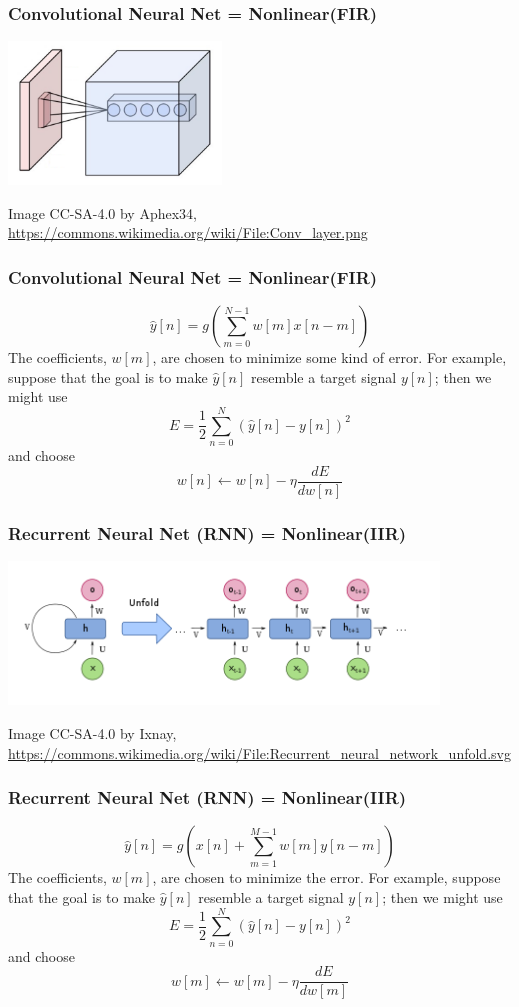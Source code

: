 \documentclass{beamer}
\begin{document}
\begin{frame}
  \frametitle{Convolutional Neural Net = Nonlinear(FIR)}
  \centerline{\includegraphics[height=1.5in]{Conv_layer.png}}
  \begin{tiny}Image CC-SA-4.0  by Aphex34, \url{https://commons.wikimedia.org/wiki/File:Conv_layer.png}\end{tiny}
\end{frame}

\begin{frame}
  \frametitle{Convolutional Neural Net = Nonlinear(FIR)}
  \[
  \hat{y}[n] = g\left(\sum_{m=0}^{N-1}w[m]x[n-m]\right)
  \]
  The coefficients, $w[m]$, are chosen to minimize some kind of error.
  For example, suppose that the goal is to make $\hat{y}[n]$ resemble a
  target signal $y[n]$; then we might use 
  \[
  E = \frac{1}{2}\sum_{n=0}^N\left(\hat{y}[n]-y[n]\right)^2
  \]
  and choose
  \[
  w[n] \leftarrow w[n]-\eta\frac{dE}{dw[n]}
  \]
\end{frame}

\begin{frame}
  \frametitle{Recurrent Neural Net (RNN) = Nonlinear(IIR)}
  \centerline{\includegraphics[width=4.5in]{Recurrent.png}}
  \begin{tiny}Image CC-SA-4.0  by Ixnay, \url{https://commons.wikimedia.org/wiki/File:Recurrent_neural_network_unfold.svg}\end{tiny}
\end{frame}

\begin{frame}
  \frametitle{Recurrent Neural Net (RNN) = Nonlinear(IIR)}
  \[
  \hat{y}[n] = g\left(x[n] + \sum_{m=1}^{M-1}w[m] y[n-m]\right)
  \]
  The coefficients, $w[m]$, are chosen to minimize the error.
  For example, suppose that the goal is to make $\hat{y}[n]$ resemble a
  target signal $y[n]$; then we might use 
  \[
  E = \frac{1}{2}\sum_{n=0}^N\left(\hat{y}[n]-y[n]\right)^2
  \]
  and choose
  \[
  w[m] \leftarrow w[m]-\eta\frac{dE}{dw[m]}
  \]
\end{frame}
\end{document}

